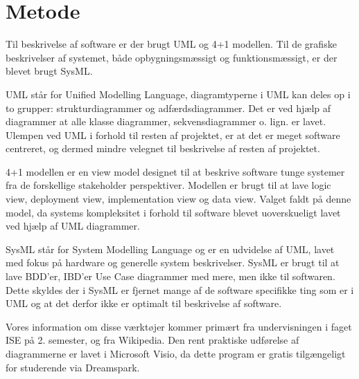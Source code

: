 \section{Metode}

Til beskrivelse af software er der brugt UML og 4+1 modellen. Til de grafiske beskrivelser af systemet, både opbygningsmæssigt og funktionsmæssigt, er der blevet brugt SysML.

UML står for Unified Modelling Language, diagramtyperne i UML kan deles op i to grupper: strukturdiagrammer og adfærdsdiagrammer. Det er ved hjælp af diagrammer at alle klasse diagrammer, sekvensdiagrammer o. lign. er lavet. Ulempen ved UML i forhold til resten af projektet, er at det er meget software centreret, og dermed mindre velegnet til beskrivelse af resten af projektet. 

4+1 modellen er en view model designet til at beskrive software tunge systemer fra de forskellige stakeholder perspektiver. Modellen er brugt til at lave logic view, deployment view, implementation view og data view. Valget faldt på denne model, da systems kompleksitet i forhold til software blevet uoverskueligt lavet ved hjælp af UML diagrammer.

SysML står for System Modelling Language og er en udvidelse af UML, lavet med fokus på hardware og generelle system beskrivelser. SysML er brugt til at lave BDD’er, IBD’er Use Case diagrammer med mere, men ikke til softwaren. Dette skyldes der i SysML er fjernet mange af de software specifikke ting som er i UML og at det derfor ikke er optimalt til beskrivelse af software.

Vores information om disse værktøjer kommer primært fra undervisningen i faget ISE på 2. semester, og fra Wikipedia. Den rent praktiske udførelse af diagrammerne er lavet i Microsoft Visio, da dette program er gratis tilgængeligt for studerende via Dreamspark.
